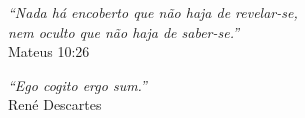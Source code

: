 \begin{epigrafe}
    \vspace*{\fill}
    \begin{flushright}
        \textit{``Nada há encoberto que não haja de revelar-se,\\
        nem oculto que não haja de saber-se.''}\\
        Mateus 10:26
    \end{flushright}
    \vspace*{2cm}
    \begin{flushleft}
        \textit{``Ego cogito ergo sum.''}\\
        René Descartes
    \end{flushleft}
    \vspace*{\fill}
\end{epigrafe}
